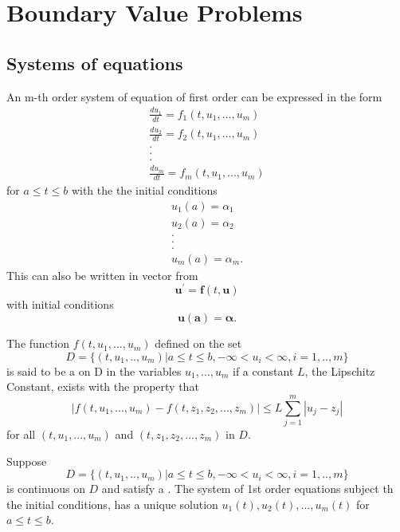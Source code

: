 \chapter{Boundary Value Problems}
\section{Systems of equations}
An m-th order system of equation of first order  can be expressed in the form
\begin{equation}\label{sys eqn}
\begin{array}{cl}
\frac{du_1}{dt}=f_1(t,u_1,...,u_m) \\ 
\frac{du_2}{dt}=f_2(t,u_1,...,u_m) \\ 
.\\
.\\
.\\
\frac{du_m}{dt}=f_m(t,u_1,...,u_m) 
\end{array}
\end{equation}
for $a \leq t \leq b$ with the the initial conditions
\begin{equation}\label{sys con}
\begin{array}{cl}
u_1(a)=\alpha_1\\
u_2(a)=\alpha_2\\
.\\
.\\
.\\
u_m(a)=\alpha_m.
\end{array}
\end{equation}
This can also be written in vector from
\[\mathbf{u^{'}}=\mathbf{f}(t,\mathbf{u}) \]
with initial conditions
\[\mathbf{u(a)=\alpha}.
\]
\begin{definition}
The function $f(t,u_1,...,u_m)$ defined on the set
\[
D=\{(t,u_1,..,u_m)|a\leq t \leq b, -\infty < u_i < \infty, i=1,..,m \}
\]
is said to be a \textbf{} on D in the variables $u_1,...,u_m$ if a
constant $L$, the Lipschitz Constant, exists with the property that 
\[ |f(t,u_1,...,u_m)-f(t,z_1,z_2,...,z_m)| \leq L \sum_{j=1}^{m}|u_j-z_j| \]
for all $(t,u_1,...,u_m)$ and $(t,z_1,z_2,...,z_m)$ in $D$.
\end{definition}
\begin{theorem}
Suppose
\[
D=\{(t,u_1,..,u_m)|a\leq t \leq b, -\infty < u_i < \infty, i=1,..,m \}
\]
is continuous on $D$ and satisfy a .  The system of 1st order
equations subject th the initial conditions, has a unique solution
$u_1(t),u_2(t),...,u_m(t)$ for $a\leq t \leq b$.
\end{theorem}
